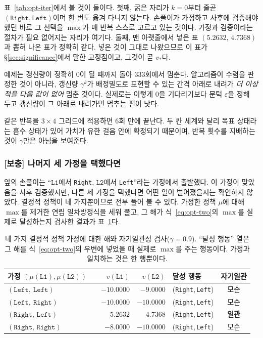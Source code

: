 \documentclass[11pt,a4paper]{article}
\newcommand{\Lone}{\texttt{L1}}
\newcommand{\Ltwo}{\texttt{L2}}
\begin{document}
표~\ref{tab:opt-iter}에서 볼 것이 둘이다. 첫째, 굵은 자리가 $k=0$부터 줄곧
$(\texttt{Right},\texttt{Left})$이며 한 번도 옮겨 다니지 않는다. 손풀이가 가정하고 사후에 검증해야 했던
바로 그 선택을 $\max$가 매 반복 스스로 고르고 있는 것이다. 가정과 검증이라는 절차가 필요 없어지는
자리가 여기다. 둘째, 맨 아랫줄에서 넣은 표 $(5.2632,\,4.7368)$과 뽑혀 나온 표가 정확히 같다. 넣은 것이
그대로 나왔으므로 이 표가 \S\ref{sec:significance}에서 말한 고정점이고, 그것이 곧 $v_*$다.

예제는 갱신량이 정확히 $0$이 될 때까지 돌아 333회에서 멈춘다. 알고리즘이 수렴을 판정한 것이 아니라,
갱신량 $\gamma^k$가 배정밀도로 표현할 수 있는 간격 아래로 내려가 \emph{더 이상 적을 다음 값이 없어} 멈춘
것이다. 실제로는 이렇게 $0$을 기다리기보다 문턱 $\varepsilon$을 정해 두고 갱신량이 그 아래로 내려가면
멈추는 편이 낫다.

같은 반복을 $3\times4$ 그리드에 적용하면 6회 만에 끝난다. 두 칸 세계와 달리 목표 상태라는 흡수 상태가
있어 가치가 유한 걸음 안에 확정되기 때문이며, 반복 횟수를 지배하는 것이 $\gamma$만은 아님을 보여준다.

\subsubsection{[보충] 나머지 세 가정을 택했다면}

앞의 손풀이는 ``$\Lone$에서 \texttt{Right}, $\Ltwo$에서 \texttt{Left}''라는 가정에서
출발했다. 이 가정이 맞았음을 사후 검증했지만, 다른 세 가정을 택했다면 어떤 일이 벌어졌을지는 확인하지
않았다. 결정적 정책이 네 가지뿐이므로 전부 풀어 볼 수 있다. 가정한 정책 $\mu$에 대해 $\max$를 제거한 연립
일차방정식을 세워 풀고, 그 해가 식~\eqref{eq:opt-two}의 $\max$를 실제로 달성하는지
검사한 결과가 표~\ref{tab:cases}다.

\begin{table}[htbp]
\centering
\caption{네 가지 결정적 정책 가정에 대한 해와 자기일관성 검사($\gamma=0.9$). ``달성 행동'' 열은 그 해를
식~\eqref{eq:opt-two}의 우변에 넣었을 때 실제로 $\max$를 주는 행동이다. 가정과 일치하는 것은 한 행뿐이다.}
\label{tab:cases}
\small
\begin{tabular}{@{}llrrlc@{}}
\toprule
가정 $(\mu(\Lone),\mu(\Ltwo))$ & & $v(\Lone)$ & $v(\Ltwo)$ & 달성 행동 & 자기일관 \\
\midrule
$(\texttt{Left},\ \texttt{Left})$   & & $-10.0000$ & $-9.0000$  & (\texttt{Right},\,\texttt{Left}) & 모순 \\
$(\texttt{Left},\ \texttt{Right})$  & & $-10.0000$ & $-10.0000$ & (\texttt{Right},\,\texttt{Left}) & 모순 \\
$(\texttt{Right},\,\texttt{Left})$  & & $\mathbf{5.2632}$ & $\mathbf{4.7368}$ & (\texttt{Right},\,\texttt{Left}) & \textbf{일관} \\
$(\texttt{Right},\,\texttt{Right})$ & & $-8.0000$  & $-10.0000$ & (\texttt{Right},\,\texttt{Left}) & 모순 \\
\bottomrule
\end{tabular}
\end{table}
\end{document}
